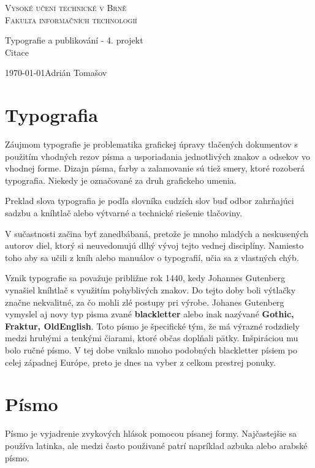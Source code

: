 \documentclass[a4paper, 11pt]{article}
\begin{document}
\begin{center}
\thispagestyle{empty}
\Huge
\textsc{Vysoké učení technické v Brně\\
\huge Fakulta informačních technologií\\}

\LARGE Typografie a publikování - 4. projekt\\
\Huge Citace
\end{center}
{\LARGE \today \hfill Adrián Tomašov}
\pagebreak


\section{Typografia}

Záujmom typografie je problematika grafickej úpravy tlačených dokumentov s použitím vhodných rezov písma a usporiadania jednotlivých znakov a odsekov vo vhodnej forme. Dizajn písma, farby a zalamovanie sú tiež smery, ktoré rozoberá typografia. Niekedy je označované za druh grafickeho umenia.

Preklad slova typografia je podľa slovníka cudzích slov buď odbor zahrňajúci sadzbu a kníhtlač alebo výtvarné a technické riešenie tlačoviny. \cite{def}

V sučastnosti začina byť zanedbábaná, pretože je mnoho mladých a neskusených autorov diel, ktorý si neuvedomujú dlhý vývoj tejto vednej disciplíny. Namiesto toho aby sa učili z kníh alebo manuálov o typografií, učia sa z vlastných chýb. \cite{forisek}

Vznik typografie sa považuje približne rok 1440, kedy  Johannes Gutenberg   vynašiel kníhtlač s využitím pohyblivých znakov. Do tejto doby boli výtlačky značne nekvalitné, za čo mohli zlé postupy pri výrobe. \cite{polyg} Johanes Gutenberg vymyslel aj novy typ pisma zvané \textbf{blackletter} alebo inak nazývané \textbf{Gothic, Fraktur, OldEnglish}. Toto písmo je špecifické tým, že má výrazné rodzdiely medzi hrubými a tenkými čiarami, ktoré občas doplňali pätky. Inšpiráciou mu bolo ručné písmo. V tej dobe vnikalo mnoho podobných blackletter písiem po celej západnej Európe, preto je dnes na vyber z celkom prestrej ponuky. \cite{blackletter}


\section{Písmo} 
Písmo je vyjadrenie zvykových hlások pomocou písanej formy. Najčastejšie sa používa latinka, ale medzi často použivané patrí napríklad azbuka alebo arabské písmo. \cite{chempc}
\end{document}
